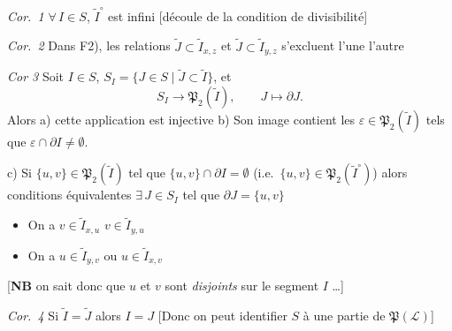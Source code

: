 \documentclass[11pt,a4paper]{article}
\begin{document}
\emph{Cor.~1} $\forall\, I \in S$, $\widetilde{I}^{\circ}$ est infini [découle de la condition de divisibilité]

\emph{Cor.~2} Dans F2), les relations $\widetilde{J} \subset \widetilde{I}_{x,z}$ et $\widetilde{J} \subset \widetilde{I}_{y,z}$ s'excluent l'une l'autre

\emph{Cor 3} Soit $I \in S$, \struck{\ill{}} $S_I = \lbrace J \in S \mid \widetilde{J} \subset \widetilde{I} \rbrace$, et
\[
  S_I \to \mathfrak{P}_2(\widetilde{I}), \qquad J \mapsto \partial J.
\]
Alors  a) cette application est injective b) Son image contient les $\varepsilon \in \mathfrak{P}_2(\widetilde{I})$ tels que $\varepsilon \cap \partial I \neq \emptyset$.

c) Si $\{u,v\} \in \mathfrak{P}_2(\widetilde{I})$ tel que $\{u,v\} \cap \partial I = \emptyset$ (i.e.\ $\{u,v\} \in \mathfrak{P}_2(\widetilde{I}^{\circ})$) alors conditions équivalentes \struck{\ill{}} $\exists\, J \in S_I$ tel que $\partial J = \{u,v\}$
\begin{itemize}
  \item[2)] On a $v \in \widetilde{I}_{x,u}$  $v \in \widetilde{I}_{y,u}$
  \item[3)] On a $u \in \widetilde{I}_{y,v}$ ou $u \in \widetilde{I}_{x,v}$
\end{itemize}

[\textbf{NB} on sait donc que $u$ et $v$ sont  \emph{disjoints} sur le segment $I$ \ill{} \ldots]

\emph{Cor.~4} Si $\widetilde{I} = \widetilde{J}$ alors $I = J$ [Donc on peut identifier $S$ à une partie de $\mathfrak{P}(\mathcal{L})$]

\end{document}
